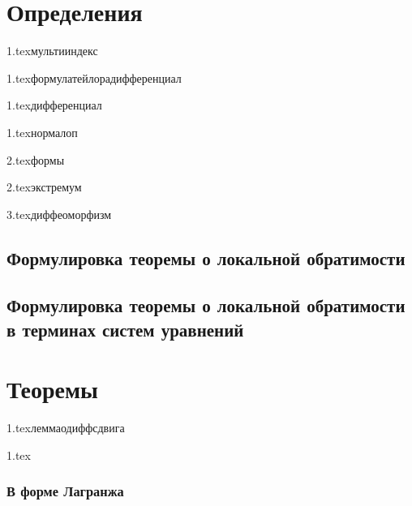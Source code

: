 

\usepackage{sectsty}

\allsectionsfont{\raggedright}
\subsectionfont{\fontsize{14}{15}\selectfont}

\cfoot{}
\rfoot{}




\section{Определения}

{1.tex}{мультииндекс}

{1.tex}{формулатейлорадифференциал}

{1.tex}{дифференциал}

{1.tex}{нормалоп}

{2.tex}{формы}

{2.tex}{экстремум}

{3.tex}{диффеоморфизм}

\subsection{Формулировка теоремы о локальной обратимости}

\subsection{Формулировка теоремы о локальной обратимости в терминах систем уравнений}

\section{Теоремы}

{1.tex}{леммаодиффсдвига}

{1.tex}{}
\subsubsection{В форме Лагранжа}
